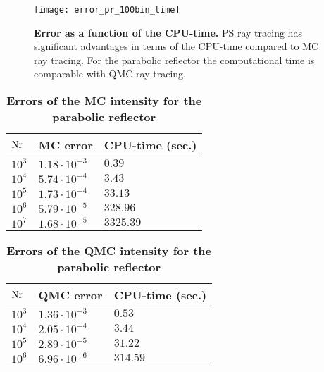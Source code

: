 \begin{figure}[t]
  \center
  \texttt{[image: error\_pr\_100bin\_time]}
  \caption{\textbf{Error as a function of the CPU-time.} PS ray tracing has significant advantages in terms of the CPU-time compared to MC ray tracing. For the parabolic reflector the computational time is comparable with QMC ray tracing.}
  \label{fig:error_time_pr}
\end{figure} 
\begin{table}[t] 
\centering
\caption{\bf Errors of the MC intensity for the parabolic reflector}
\begin{tabular}{lll}
 \hline   $\textrm{Nr}$ & MC error & CPU-time (sec.) \\
  \hline 
 $10^3$     & $1.18\cdot10^{-3}$ & $0.39$\\
 $10^4$     & $5.74\cdot 10^{-4}$ & $3.43$ \\
 $10^5$     & $1.73\cdot 10^{-4}$ & $33.13$\\
 $10^6$     & $5.79\cdot 10^{-5}$ & $328.96$\\
 $10^7$     & $1.68\cdot 10^{-5}$ & $3325.39$\\
 \hline
 \end{tabular}
 \label{tab:mc_error_pr_triangulation}
 \end{table}
\begin{table}[t] 
\centering
\caption{\bf Errors of the QMC intensity for the parabolic reflector}
\begin{tabular}{lll}
 \hline   $\textrm{Nr}$ & QMC error & CPU-time (sec.) \\
  \hline 
 $10^3$     & $1.36\cdot10^{-3}$ & $0.53$\\
 $10^4$     & $2.05\cdot 10^{-4}$ & $3.44$ \\
 $10^5$     & $2.89\cdot 10^{-5}$ & $31.22$\\
 $10^6$     & $6.96\cdot 10^{-6}$ & $314.59$\\
 \hline
 \end{tabular}
 \label{tab:QMC_error_pr_triangulation}
 \end{table}
